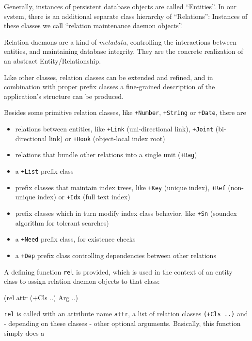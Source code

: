 Generally, instances of persistent database objects are called
``Entities''. In our system, there is an additional separate class
hierarchy of ``Relations'': Instances of these classes we call ``relation
maintenance daemon objects''.

Relation daemons are a kind of \emph{metadata}, controlling the interactions
between entities, and maintaining database integrity. They are the
concrete realization of an abstract Entity/Relationship.

Like other classes, relation classes can be extended and refined, and in
combination with proper prefix classes a fine-grained description of the
application's structure can be produced.

Besides some primitive relation classes, like \texttt{+Number}, \texttt{+String} or
\texttt{+Date}, there are

\begin{itemize}
\item relations between entities, like \texttt{+Link} (uni-directional link),
   \texttt{+Joint} (bi-directional link) or \texttt{+Hook} (object-local index root)
\item relations that bundle other relations into a single unit (\texttt{+Bag})
\item a \texttt{+List} prefix class
\item prefix classes that maintain index trees, like \texttt{+Key} (unique index),
   \texttt{+Ref} (non-unique index) or \texttt{+Idx} (full text index)
 \item prefix classes which in turn modify index class behavior, like
   \texttt{+Sn} (soundex algorithm for tolerant searches)~\cite{knuth}
\item a \texttt{+Need} prefix class, for existence checks
\item a \texttt{+Dep} prefix class controlling dependencies between other
   relations
\end{itemize}

A defining function \texttt{rel} is provided, which is used in the context of
an entity class to assign relation daemon objects to that class:


\begin{wideverbatim}
(rel attr (+Cls ..) Arg ..)
\end{wideverbatim}

\texttt{rel} is called with an attribute name \texttt{attr}, a list of relation
classes \texttt{(+Cls ..)} and - depending on these classes - other optional
arguments. Basically, this function simply does a


